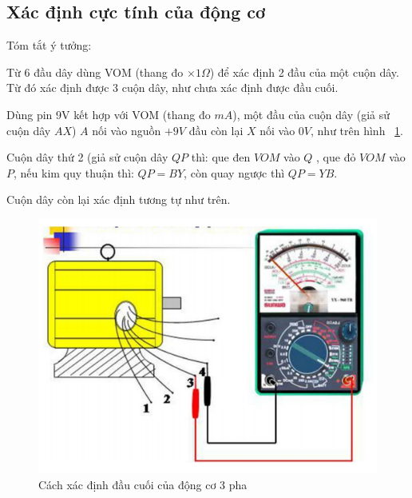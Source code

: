 \documentclass[13pt,a4paper]{extarticle}
\begin{document}
\subsection{Xác định cực tính của động cơ}
Tóm tắt ý tưởng:
\begin{list}{--}{}
\item Từ 6 đầu dây dùng VOM (thang đo $\times 1 \Omega$) để xác định 2 đầu của một cuộn dây. Từ đó xác định được 3 cuộn dây, như chưa xác định được đầu cuối.
\item Dùng pin 9V kết hợp với VOM (thang đo $mA$), một đầu của cuộn dây (giả sử cuộn dây $AX$) $A$ nối vào nguồn $+9V$ đầu còn lại $X$ nối vào $0V$, như trên hình ~\ref{Fig:dau-cuoi-3-pha}.
\item Cuộn dây thứ 2 (giả sử cuộn dây $QP$ thì: que đen $VOM$ vào $Q$ , que đỏ $VOM$ vào $P$, nếu kim quy thuận thì: $QP=BY$, còn quay ngược thì $QP = YB$.
\item Cuộn dây còn lại xác định tương tự như trên.
\begin{figure}[!h]
\begin{center}
\includegraphics[scale=.5]{VOM-PIN} 
\end{center}
\caption{Cách xác định đầu cuối của động cơ 3 pha}\label{Fig:dau-cuoi-3-pha}
\end{figure}
\end{list}
\newpage
\end{document}
